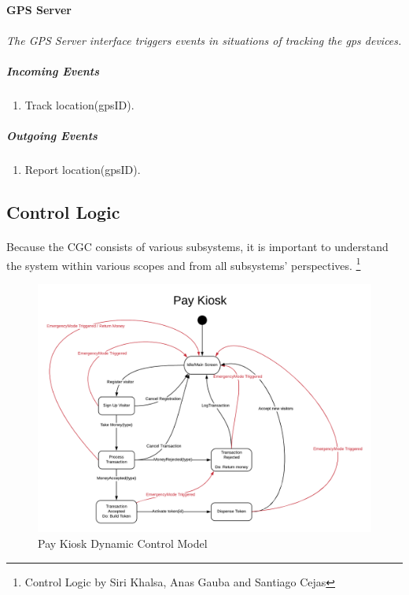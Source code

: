 \documentclass[12pt]{article}
\begin{document}
	\paragraph{GPS Server}
	\paragraph{}\textit{The GPS Server interface triggers events in situations of tracking the gps devices. }
	    \subparagraph{Incoming Events}
		\begin{enumerate}
			\item Track location(gpsID).
		\end{enumerate}
				
	    \subparagraph{Outgoing Events}
		\begin{enumerate}
			\item Report location(gpsID).
		\end{enumerate}						
		
    \subsection{Control Logic} \label{logic}%
	\paragraph{} Because the CGC consists of various subsystems, it is important to understand 
	the system within various scopes and from all subsystems' perspectives. \footnote{Control 
	Logic by Siri Khalsa, Anas Gauba and Santiago Cejas}

    \begin{figure}[H]
 		\centerline{\includegraphics[scale=0.30]{PayKiosk.png}}
 		\caption{Pay Kiosk Dynamic Control Model}
  		\label{fig:normal}
    \end{figure}
\end{document}
